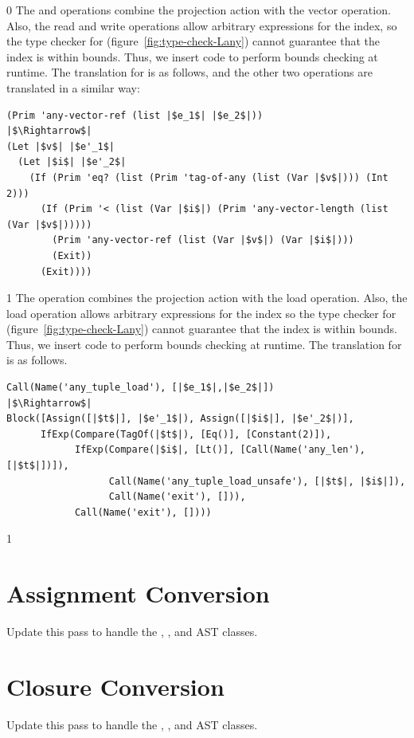 \documentclass[7x10]{TimesAPriori_MIT}%
\def\racketEd{0}
\def\pythonEd{1}
\def\edition{1}
\newcommand{\pythonColor}[0]{}
\numberwithin{theorem}{chapter}
\numberwithin{definition}{chapter}
\numberwithin{equation}{chapter}
\begin{document}
{\if\edition\racketEd    
The  and  operations
combine the projection action with the vector operation.  Also, the
read and write operations allow arbitrary expressions for the index, so
the type checker for \LangAny{} (figure~\ref{fig:type-check-Lany})
cannot guarantee that the index is within bounds. Thus, we insert code
to perform bounds checking at runtime. The translation for
 is as follows, and the other two operations are
translated in a similar way:
\begin{center}
\begin{minipage}{0.95\textwidth}
\begin{lstlisting}
(Prim 'any-vector-ref (list |$e_1$| |$e_2$|))
|$\Rightarrow$|
(Let |$v$| |$e'_1$|
  (Let |$i$| |$e'_2$|
    (If (Prim 'eq? (list (Prim 'tag-of-any (list (Var |$v$|))) (Int 2)))
      (If (Prim '< (list (Var |$i$|) (Prim 'any-vector-length (list (Var |$v$|)))))
        (Prim 'any-vector-ref (list (Var |$v$|) (Var |$i$|)))
        (Exit))
      (Exit))))
\end{lstlisting}
\end{minipage}
\end{center}
\fi}
%
{\if\edition\pythonEd\pythonColor
%
The  operation combines the projection action
with the load operation.  Also, the load operation allows arbitrary
expressions for the index so the type checker for \LangAny{}
(figure~\ref{fig:type-check-Lany}) cannot guarantee that the index is
within bounds. Thus, we insert code to perform bounds checking at
runtime. The translation for  is as follows.

\begin{lstlisting}
Call(Name('any_tuple_load'), [|$e_1$|,|$e_2$|])
|$\Rightarrow$|
Block([Assign([|$t$|], |$e'_1$|), Assign([|$i$|], |$e'_2$|)],
      IfExp(Compare(TagOf(|$t$|), [Eq()], [Constant(2)]),
            IfExp(Compare(|$i$|, [Lt()], [Call(Name('any_len'), [|$t$|])]),
                  Call(Name('any_tuple_load_unsafe'), [|$t$|, |$i$|]),
                  Call(Name('exit'), [])),
            Call(Name('exit'), [])))
\end{lstlisting}
\fi}


{\if\edition\pythonEd\pythonColor

\section{Assignment Conversion}
\label{sec:convert-assignments-Lany}

Update this pass to handle the , , and
 AST classes.

\section{Closure Conversion}
\label{sec:closure-conversion-Lany}

Update this pass to handle the , , and
 AST classes.

\fi}
\end{document}
